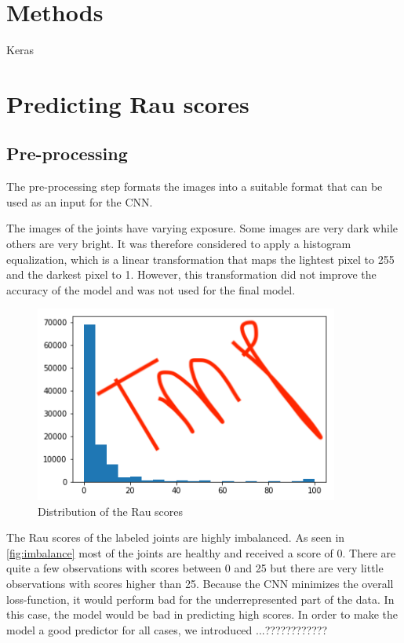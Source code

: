 \documentclass[12pt]{article}
\begin{document}
\section{Methods}
\label{sec:methods}

Keras %

\section{Predicting Rau scores}

\subsection{Pre-processing}

The pre-processing step formats the images into a suitable format that can be used as an input for the CNN. 

The images of the joints have varying exposure. Some images are very dark while others are very bright. It was therefore considered to apply a histogram equalization, which is a linear transformation that maps the lightest pixel to 255 and the darkest pixel to 1. However, this transformation did not improve the accuracy of the model and was not used for the final model.

\begin{figure}[ht]
\includegraphics[width=10cm]{imbalance}	
\caption{Distribution of the Rau scores}
\label{fig:imbalance}
\end{figure}

The Rau scores of the labeled joints are highly imbalanced. As seen in \autoref{fig:imbalance} most of the joints are healthy and received a score of 0. There are quite a few observations with scores between 0 and 25 but there are very little observations with scores higher than 25. Because the CNN minimizes the overall loss-function, it would perform bad for the underrepresented part of the data. In this case, the model would be bad in predicting high scores. In order to make the model a good predictor for all cases, we introduced ...????????????
\end{document}
